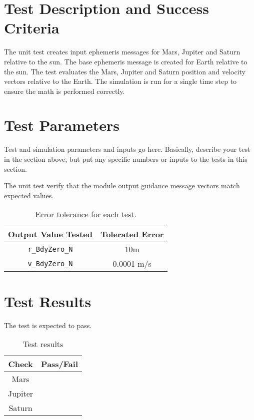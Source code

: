 
\section{Test Description and Success Criteria}
The unit test creates  input ephemeris messages for Mars, Jupiter and Saturn relative to the sun.  The base ephemeris message is created for Earth relative to the sun.  The test evaluates the Mars, Jupiter and Saturn position and velocity vectors relative to the Earth.  The simulation is run for a single time step to ensure the math is performed correctly.  



\section{Test Parameters}

Test and simulation parameters and inputs go here. Basically, describe your test in the section above, but put any specific numbers or inputs to the tests in this section.

The unit test verify that the module output guidance message vectors match expected values.
\begin{table}[htbp]
	\caption{Error tolerance for each test.}
	\label{tab:errortol}
	\centering \fontsize{10}{10}\selectfont
	\begin{tabular}{ c | c } %
		\hline\hline
		\textbf{Output Value Tested}  & \textbf{Tolerated Error}  \\ 
		\hline
		{\tt r\_BdyZero\_N}        & 10m 	   \\ 
		{\tt v\_BdyZero\_N}        & 0.0001 m/s 	   \\ 
		\hline\hline
	\end{tabular}
\end{table}




\section{Test Results}
The test is expected to pass.
\begin{table}[H]
	\caption{Test results}
	\label{tab:results}
	\centering \fontsize{10}{10}\selectfont
	\begin{tabular}{c | c  } %
		\hline\hline
		\textbf{Check} 						  		&\textbf{Pass/Fail} \\ 
		\hline
	   Mars	   			&  \\ 
	   Jupiter	   			&  \\ 
	   Saturn	   			&  \\ 
	   \hline\hline
	\end{tabular}
\end{table}




